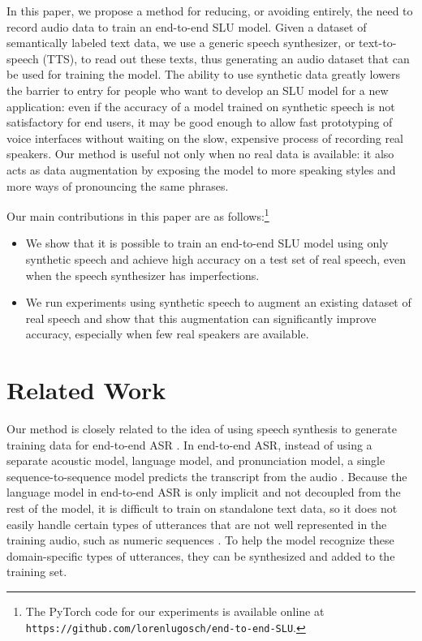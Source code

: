 \documentclass{article}
\begin{document}
In this paper, we propose a method for reducing, or avoiding entirely, the need to record audio data to train an end-to-end SLU model. Given a dataset of semantically labeled text data, we use a generic speech synthesizer, or text-to-speech (TTS), to read out these texts, thus generating an audio dataset that can be used for training the model. The ability to use synthetic data greatly lowers the barrier to entry for people who want to develop an SLU model for a new application: even if the accuracy of a model trained on synthetic speech is not satisfactory for end users, it may be good enough to allow fast prototyping of voice interfaces without waiting on the slow, expensive process of recording real speakers. 
Our method is useful not only when no real data is available: it also acts as data augmentation by exposing the model to more speaking styles and more ways of pronouncing the same phrases.

Our main contributions in this paper are as follows:\footnote{The PyTorch code for our experiments is available online at \texttt{https://github.com/lorenlugosch/end-to-end-SLU}.}
\begin{itemize}
    \item We show that it is possible to train an end-to-end SLU model using only synthetic speech and achieve high accuracy on a test set of real speech, even when the speech synthesizer has imperfections.
    \item We run experiments using synthetic speech to augment an existing dataset of real speech and show that this augmentation can significantly improve accuracy, especially when few real speakers are available.
\end{itemize}

\section{Related Work}
\label{sec:related_work}

Our method is closely related to the idea of using speech synthesis to generate training data for end-to-end ASR \cite{li2018training, rosenberg2019speech}. In end-to-end ASR, instead of using a separate acoustic model, language model, and pronunciation model, a single sequence-to-sequence model predicts the transcript from the audio \cite{graves2014towards}. Because the language model in end-to-end ASR is only implicit and not decoupled from the rest of the model, it is difficult to train on standalone text data, so it does not easily handle certain types of utterances that are not well represented in the training audio, such as numeric sequences \cite{Peyser2019,He2019}. To help the model recognize these domain-specific types of utterances, they can be synthesized and added to the training set.
\end{document}
